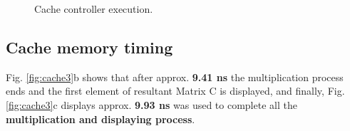 \documentclass[]{article}
\begin{document}
\begin{figure}[H]
	\centering
	\caption{Cache controller execution.}
	\label{fig:cache2}
\end{figure}

\subsection{Cache memory timing}
Fig. \ref{fig:cache3}b shows that after approx. \textbf{9.41 ns} the multiplication process ends and the first element of resultant Matrix C is displayed, and finally, Fig. \ref{fig:cache3}c displays approx. \textbf{9.93 ns} was used to complete all the \textbf{multiplication and displaying process}.  
\end{document}
